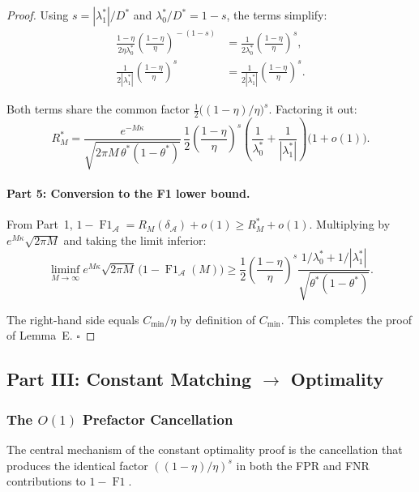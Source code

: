 \begin{proof}
  Using $s=|\lambda_1^*|/D^*$ and $\lambda_0^*/D^*=1-s$, the terms simplify:
  \[
  \begin{aligned}
  \frac{1-\eta}{2\eta\lambda_0^*}
    \left(\frac{1-\eta}{\eta}\right)^{\!-(1-s)}
  &= \frac1{2\lambda_0^*}
     \left(\frac{1-\eta}{\eta}\right)^{\!s},\\[4pt]
  \frac1{2|\lambda_1^*|}
    \left(\frac{1-\eta}{\eta}\right)^{\!s}
  &= \frac1{2|\lambda_1^*|}
     \left(\frac{1-\eta}{\eta}\right)^{\!s}.
  \end{aligned}
  \]

  Both terms share the common factor
  $\frac12\bigl((1-\eta)/\eta\bigr)^s$.  Factoring it out:
  \[
  R_M^* = \frac{e^{-M\kappa}}
              {\sqrt{2\pi M\,\theta^*(1-\theta^*)}}\,
          \frac12\left(\frac{1-\eta}{\eta}\right)^{\!s}
          \left(\frac1{\lambda_0^*} + \frac1{|\lambda_1^*|}\right)
          \bigl(1+o(1)\bigr).
  \]

  \paragraph{Part 5: Conversion to the F1 lower bound.}
  From Part~1, $1-\operatorname{F1}_{\mathcal{A}} = R_M(\delta_{\mathcal{A}}) + o(1)
  \ge R_M^* + o(1)$.  Multiplying by $e^{M\kappa}\sqrt{2\pi M}$ and taking the
  limit inferior:
  \[
  \liminf_{M\to\infty}
    e^{M\kappa}\sqrt{2\pi M}\,
    \bigl(1-\operatorname{F1}_{\mathcal{A}}(M)\bigr)
  \ge \frac12\left(\frac{1-\eta}{\eta}\right)^{\!s}
      \frac{1/\lambda_0^* + 1/|\lambda_1^*|}
           {\sqrt{\theta^*(1-\theta^*)}}.
  \]

  The right-hand side equals $C_{\min}/\eta$ by definition of $C_{\min}$.
  This completes the proof of Lemma~E. \hfill$\square$
\end{proof}

\subsection{Part III: Constant Matching $\to$ Optimality}
\label{sec:thm4_matching}

\subsubsection{The $O(1)$ Prefactor Cancellation}

The central mechanism of the constant optimality proof is the cancellation
that produces the identical factor $((1-\eta)/\eta)^s$ in both the FPR and
FNR contributions to $1-\operatorname{F1}$.

